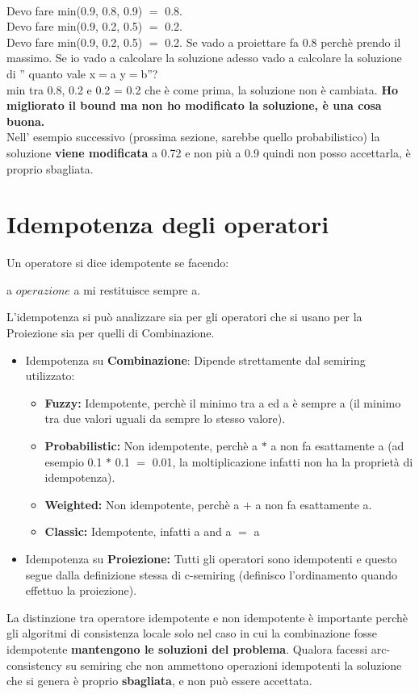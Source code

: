 \\Devo fare min(0.9, 0.8, 0.9) $=$ 0.8.
\\Devo fare min(0.9, 0.2, 0.5) $=$ 0.2.
\\Devo fare min(0.9, 0.2, 0.5) $=$ 0.2.
Se vado a proiettare fa 0.8 perchè prendo il massimo. Se io vado a calcolare la soluzione adesso vado a calcolare la soluzione di '' quanto vale x$=$a y$=$b''?
\\min tra 0.8, 0.2 e 0.2 = 0.2 che è come prima, la soluzione non è cambiata.
\textbf{Ho migliorato il bound ma non ho modificato la soluzione, è una cosa buona.}
\\Nell’ esempio successivo (prossima sezione, sarebbe quello probabilistico) la soluzione \textbf{viene modificata} a 0.72 e non più a 0.9 quindi non posso accettarla, è proprio sbagliata.
\section{Idempotenza degli operatori}
Un operatore si dice idempotente se facendo:
\begin{center}
    a $operazione$ a mi restituisce sempre a.
\end{center}
L’idempotenza si può analizzare sia per gli operatori che si usano per la Proiezione sia per quelli di Combinazione.\\
\begin{itemize}
    \item Idempotenza su \textbf{Combinazione}: Dipende strettamente dal semiring utilizzato:
    \begin{itemize}
        \item \textbf{Fuzzy:} Idempotente, perchè il minimo tra a ed a è sempre a (il minimo tra due valori uguali da sempre lo stesso valore).
        \item \textbf{Probabilistic:} Non idempotente, perchè a $*$ a non fa esattamente a (ad esempio 0.1 $*$ 0.1 $=$ 0.01, la moltiplicazione infatti non ha la proprietà di idempotenza).
        \item \textbf{Weighted:} Non idempotente, perchè a $+$ a non fa esattamente a.
        \item \textbf{Classic:} Idempotente, infatti a and a $=$ a
    \end{itemize}
    \item Idempotenza su \textbf{Proiezione:} Tutti gli operatori sono idempotenti e questo segue dalla definizione stessa di c-semiring (definisco l’ordinamento quando effettuo la proiezione).
\end{itemize}
La distinzione tra operatore idempotente e non idempotente è importante perchè gli algoritmi di consistenza locale solo nel caso in cui la combinazione fosse idempotente \textbf{mantengono le soluzioni del problema}. Qualora facessi arc-consistency su semiring che non ammettono operazioni idempotenti la soluzione che si genera è proprio \textbf{sbagliata}, e non può essere accettata.
\vspace{1cm}

